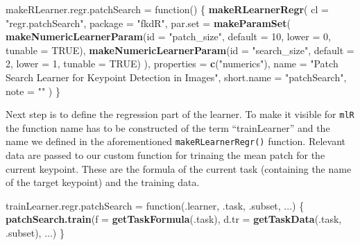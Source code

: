 \documentclass[]{article}
\newenvironment{Shaded}{\begin{snugshade}}{\end{snugshade}}
\newcommand{\KeywordTok}[1]{\textcolor[rgb]{0.13,0.29,0.53}{\textbf{{#1}}}}
\newcommand{\DataTypeTok}[1]{\textcolor[rgb]{0.13,0.29,0.53}{{#1}}}
\newcommand{\DecValTok}[1]{\textcolor[rgb]{0.00,0.00,0.81}{{#1}}}
\newcommand{\StringTok}[1]{\textcolor[rgb]{0.31,0.60,0.02}{{#1}}}
\newcommand{\OtherTok}[1]{\textcolor[rgb]{0.56,0.35,0.01}{{#1}}}
\newcommand{\NormalTok}[1]{{#1}}
\begin{document}
\begin{Shaded}
\begin{Highlighting}[]
\NormalTok{makeRLearner.regr.patchSearch =}\StringTok{ }\NormalTok{function() \{}
  \KeywordTok{makeRLearnerRegr}\NormalTok{(}
    \DataTypeTok{cl =} \StringTok{"regr.patchSearch"}\NormalTok{,}
    \DataTypeTok{package =} \StringTok{"fkdR"}\NormalTok{,}
    \DataTypeTok{par.set =} \KeywordTok{makeParamSet}\NormalTok{(}
      \KeywordTok{makeNumericLearnerParam}\NormalTok{(}\DataTypeTok{id =} \StringTok{"patch_size"}\NormalTok{, }\DataTypeTok{default =} \DecValTok{10}\NormalTok{, }\DataTypeTok{lower =} \DecValTok{0}\NormalTok{, }\DataTypeTok{tunable =} \OtherTok{TRUE}\NormalTok{),}
      \KeywordTok{makeNumericLearnerParam}\NormalTok{(}\DataTypeTok{id =} \StringTok{"search_size"}\NormalTok{, }\DataTypeTok{default =} \DecValTok{2}\NormalTok{, }\DataTypeTok{lower =} \DecValTok{1}\NormalTok{, }\DataTypeTok{tunable =} \OtherTok{TRUE}\NormalTok{)}
    \NormalTok{),}
    \DataTypeTok{properties =} \KeywordTok{c}\NormalTok{(}\StringTok{"numerics"}\NormalTok{),}
    \DataTypeTok{name =} \StringTok{"Patch Search Learner for Keypoint Detection in Images"}\NormalTok{,}
    \DataTypeTok{short.name =} \StringTok{"patchSearch"}\NormalTok{,}
    \DataTypeTok{note =} \StringTok{""}
  \NormalTok{)}
\NormalTok{\}}
\end{Highlighting}
\end{Shaded}

Next step is to define the regression part of the learner. To make it
visible for \texttt{mlR} the function name has to be constructed of the
term ``trainLearner'' and the name we defined in the aforementioned
\texttt{makeRLearnerRegr()} function. Relevant data are passed to our
custom function for trinaing the mean patch for the current keypoint.
These are the formula of the current task (containing the name of the
target keypoint) and the training data.

\begin{Shaded}
\begin{Highlighting}[]
\NormalTok{trainLearner.regr.patchSearch =}\StringTok{ }\NormalTok{function(.learner, .task, .subset, ...) \{}
  \KeywordTok{patchSearch.train}\NormalTok{(}\DataTypeTok{f =} \KeywordTok{getTaskFormula}\NormalTok{(.task),}
                    \DataTypeTok{d.tr =} \KeywordTok{getTaskData}\NormalTok{(.task, .subset),}
                    \NormalTok{...)}
\NormalTok{\}}
\end{Highlighting}
\end{Shaded}
\end{document}
